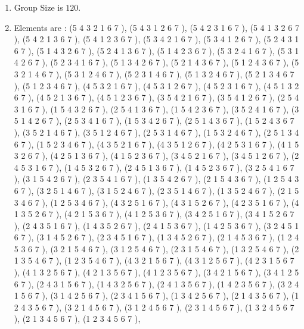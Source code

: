 \documentclass[12pt]{article}
\begin{document}
\begin{enumerate}
\item Group Size is $120$.
\item Elements are : (5 4 3 2 1 6 7  ), (5 4 3 1 2 6 7  ), (5 4 2 3 1 6 7  ), (5 4 1 3 2 6 7  ), (5 4 2 1 3 6 7  ), (5 4 1 2 3 6 7  ), (5 3 4 2 1 6 7  ), (5 3 4 1 2 6 7  ), (5 2 4 3 1 6 7  ), (5 1 4 3 2 6 7  ), (5 2 4 1 3 6 7  ), (5 1 4 2 3 6 7  ), (5 3 2 4 1 6 7  ), (5 3 1 4 2 6 7  ), (5 2 3 4 1 6 7  ), (5 1 3 4 2 6 7  ), (5 2 1 4 3 6 7  ), (5 1 2 4 3 6 7  ), (5 3 2 1 4 6 7  ), (5 3 1 2 4 6 7  ), (5 2 3 1 4 6 7  ), (5 1 3 2 4 6 7  ), (5 2 1 3 4 6 7  ), (5 1 2 3 4 6 7  ), (4 5 3 2 1 6 7  ), (4 5 3 1 2 6 7  ), (4 5 2 3 1 6 7  ), (4 5 1 3 2 6 7  ), (4 5 2 1 3 6 7  ), (4 5 1 2 3 6 7  ), (3 5 4 2 1 6 7  ), (3 5 4 1 2 6 7  ), (2 5 4 3 1 6 7  ), (1 5 4 3 2 6 7  ), (2 5 4 1 3 6 7  ), (1 5 4 2 3 6 7  ), (3 5 2 4 1 6 7  ), (3 5 1 4 2 6 7  ), (2 5 3 4 1 6 7  ), (1 5 3 4 2 6 7  ), (2 5 1 4 3 6 7  ), (1 5 2 4 3 6 7  ), (3 5 2 1 4 6 7  ), (3 5 1 2 4 6 7  ), (2 5 3 1 4 6 7  ), (1 5 3 2 4 6 7  ), (2 5 1 3 4 6 7  ), (1 5 2 3 4 6 7  ), (4 3 5 2 1 6 7  ), (4 3 5 1 2 6 7  ), (4 2 5 3 1 6 7  ), (4 1 5 3 2 6 7  ), (4 2 5 1 3 6 7  ), (4 1 5 2 3 6 7  ), (3 4 5 2 1 6 7  ), (3 4 5 1 2 6 7  ), (2 4 5 3 1 6 7  ), (1 4 5 3 2 6 7  ), (2 4 5 1 3 6 7  ), (1 4 5 2 3 6 7  ), (3 2 5 4 1 6 7  ), (3 1 5 4 2 6 7  ), (2 3 5 4 1 6 7  ), (1 3 5 4 2 6 7  ), (2 1 5 4 3 6 7  ), (1 2 5 4 3 6 7  ), (3 2 5 1 4 6 7  ), (3 1 5 2 4 6 7  ), (2 3 5 1 4 6 7  ), (1 3 5 2 4 6 7  ), (2 1 5 3 4 6 7  ), (1 2 5 3 4 6 7  ), (4 3 2 5 1 6 7  ), (4 3 1 5 2 6 7  ), (4 2 3 5 1 6 7  ), (4 1 3 5 2 6 7  ), (4 2 1 5 3 6 7  ), (4 1 2 5 3 6 7  ), (3 4 2 5 1 6 7  ), (3 4 1 5 2 6 7  ), (2 4 3 5 1 6 7  ), (1 4 3 5 2 6 7  ), (2 4 1 5 3 6 7  ), (1 4 2 5 3 6 7  ), (3 2 4 5 1 6 7  ), (3 1 4 5 2 6 7  ), (2 3 4 5 1 6 7  ), (1 3 4 5 2 6 7  ), (2 1 4 5 3 6 7  ), (1 2 4 5 3 6 7  ), (3 2 1 5 4 6 7  ), (3 1 2 5 4 6 7  ), (2 3 1 5 4 6 7  ), (1 3 2 5 4 6 7  ), (2 1 3 5 4 6 7  ), (1 2 3 5 4 6 7  ), (4 3 2 1 5 6 7  ), (4 3 1 2 5 6 7  ), (4 2 3 1 5 6 7  ), (4 1 3 2 5 6 7  ), (4 2 1 3 5 6 7  ), (4 1 2 3 5 6 7  ), (3 4 2 1 5 6 7  ), (3 4 1 2 5 6 7  ), (2 4 3 1 5 6 7  ), (1 4 3 2 5 6 7  ), (2 4 1 3 5 6 7  ), (1 4 2 3 5 6 7  ), (3 2 4 1 5 6 7  ), (3 1 4 2 5 6 7  ), (2 3 4 1 5 6 7  ), (1 3 4 2 5 6 7  ), (2 1 4 3 5 6 7  ), (1 2 4 3 5 6 7  ), (3 2 1 4 5 6 7  ), (3 1 2 4 5 6 7  ), (2 3 1 4 5 6 7  ), (1 3 2 4 5 6 7  ), (2 1 3 4 5 6 7  ), (1 2 3 4 5 6 7  ), 
\end{enumerate}
\end{document}
